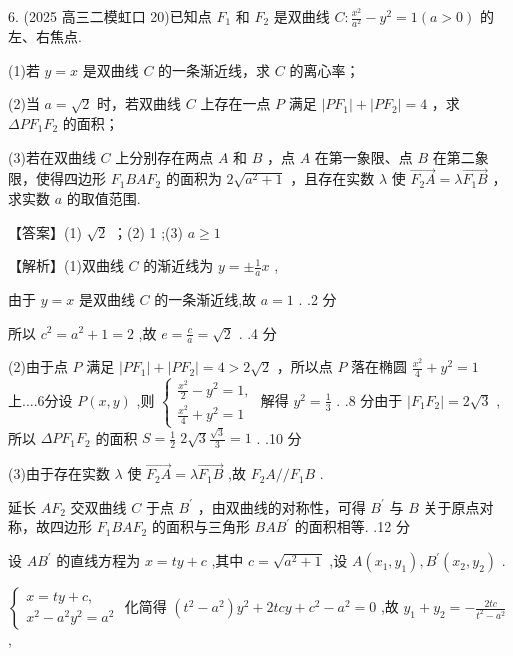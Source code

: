\documentclass[10pt]{article}
\begin{document}
6. (2025 高三二模虹口 20)已知点 \({F}_{1}\) 和 \({F}_{2}\) 是双曲线 \(C : \frac{{x}^{2}}{{a}^{2}} - {y}^{2} = 1\left( {a > 0}\right)\) 的左、右焦点.

(1)若 \(y = x\) 是双曲线 \(C\) 的一条渐近线，求 \(C\) 的离心率；

(2)当 \(a = \sqrt{2}\) 时，若双曲线 \(C\) 上存在一点 \(P\) 满足 \(\left| {P{F}_{1}}\right|  + \left| {P{F}_{2}}\right|  = 4\) ，求 \({\Delta P}{F}_{1}{F}_{2}\) 的面积；

(3)若在双曲线 \(C\) 上分别存在两点 \(A\) 和 \(B\) ，点 \(A\) 在第一象限、点 \(B\) 在第二象限，使得四边形 \({F}_{1}{BA}{F}_{2}\) 的面积为 \(2\sqrt{{a}^{2} + 1}\) ，且存在实数 \(\lambda\) 使 \(\overrightarrow{{F}_{2}A} = \lambda \overrightarrow{{F}_{1}B}\) ，求实数 \(a\) 的取值范围.

【答案】(1) \(\sqrt{2}\) ；(2) 1 ;(3) \(a \geq  1\)

【解析】(1)双曲线 \(C\) 的渐近线为 \(y =  \pm  \frac{1}{a}x\) ,

由于 \(y = x\) 是双曲线 \(C\) 的一条渐近线,故 \(a = 1\) . .2 分

所以 \({c}^{2} = {a}^{2} + 1 = 2\) ,故 \(e = \frac{c}{a} = \sqrt{2}\) . .4 分

(2)由于点 \(P\) 满足 \(\left| {P{F}_{1}}\right|  + \left| {P{F}_{2}}\right|  = 4 > 2\sqrt{2}\) ，所以点 \(P\) 落在椭圆 \(\frac{{x}^{2}}{4} + {y}^{2} = 1\) 上....6分设 \(P\left( {x,y}\right)\) ,则 \(\left\{  \begin{array}{l} \frac{{x}^{2}}{2} - {y}^{2} = 1, \\  \frac{{x}^{2}}{4} + {y}^{2} = 1 \end{array}\right.\) 解得 \({y}^{2} = \frac{1}{3}\) . .8 分由于 \(\left| {{F}_{1}{F}_{2}}\right|  = 2\sqrt{3}\) ,所以 \({\Delta P}{F}_{1}{F}_{2}\) 的面积 \(S = \frac{1}{2}\;2\sqrt{3}\frac{\sqrt{3}}{3} = 1\) . .10 分

(3)由于存在实数 \(\lambda\) 使 \(\overrightarrow{{F}_{2}A} = \lambda \overrightarrow{{F}_{1}B}\) ,故 \({F}_{2}A//{F}_{1}B\) .

延长 \(A{F}_{2}\) 交双曲线 \(C\) 于点 \({B}^{\prime }\) ，由双曲线的对称性，可得 \({B}^{\prime }\) 与 \(B\) 关于原点对称，故四边形 \({F}_{1}{BA}{F}_{2}\) 的面积与三角形 \({BA}{B}^{\prime }\) 的面积相等. .12 分

设 \(A{B}^{\prime }\) 的直线方程为 \(x = {ty} + c\) ,其中 \(c = \sqrt{{a}^{2} + 1}\) ,设 \(A\left( {{x}_{1},{y}_{1}}\right) ,{B}^{\prime }\left( {{x}_{2},{y}_{2}}\right)\) .

\(\left\{  \begin{array}{l} x = {ty} + c, \\  {x}^{2} - {a}^{2}{y}^{2} = {a}^{2} \end{array}\right.\) 化简得 \(\left( {{t}^{2} - {a}^{2}}\right) {y}^{2} + {2tcy} + {c}^{2} - {a}^{2} = 0\) ,故 \({y}_{1} + {y}_{2} =  - \frac{2tc}{{t}^{2} - {a}^{2}}\) ,
\end{document}
